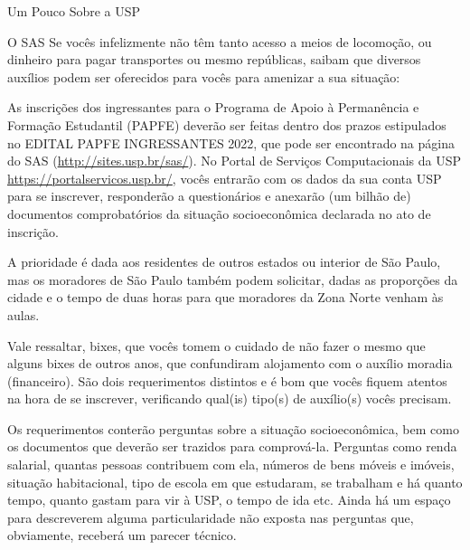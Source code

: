 \begin{secao}{Um Pouco Sobre a USP}
\begin{subsecao}{O SAS}
Se vocês infelizmente não têm tanto acesso a meios de locomoção, ou dinheiro para
pagar transportes ou mesmo repúblicas, saibam que diversos auxílios podem ser
oferecidos para vocês para amenizar a sua situação:



As inscrições dos ingressantes para o Programa de Apoio à Permanência e Formação Estudantil (PAPFE)
deverão ser feitas dentro dos prazos estipulados no EDITAL PAPFE INGRESSANTES 2022, que pode 
ser encontrado na página do SAS (\url{http://sites.usp.br/sas/}). No 
Portal de Serviços Computacionais da USP \url{https://portalservicos.usp.br/}, vocês entrarão 
com os dados da sua conta USP para se inscrever, responderão a questionários e anexarão (um bilhão de) 
documentos comprobatórios da situação socioeconômica declarada no ato de inscrição.

A prioridade é dada aos residentes de outros estados ou interior de São Paulo,
mas os moradores de São Paulo também podem solicitar, dadas as proporções da
cidade e o tempo de duas horas para que moradores da Zona Norte venham às aulas.

Vale ressaltar, bixes, que vocês tomem o cuidado de não fazer o mesmo que alguns
bixes de outros anos, que confundiram alojamento com o auxílio moradia (financeiro). São dois
requerimentos distintos e é bom que vocês fiquem atentos na hora de se inscrever, verificando
qual(is) tipo(s) de auxílio(s) vocês precisam.

Os requerimentos conterão perguntas sobre a situação socioeconômica, bem como os
documentos que deverão ser trazidos para comprová-la. Perguntas como renda
salarial, quantas pessoas contribuem com ela, números de bens móveis e imóveis,
situação habitacional, tipo de escola em que estudaram, se trabalham e há quanto
tempo, quanto gastam para vir à USP, o tempo de ida etc. Ainda há um espaço
para descreverem alguma particularidade não exposta nas perguntas que, obviamente,
receberá um parecer técnico.


\end{subsecao}
\end{secao}
